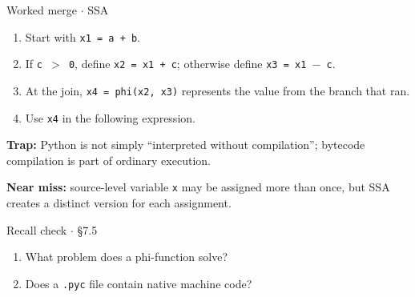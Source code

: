 \documentclass[11pt]{article}
\begin{document}
\begin{keepsection}
\begin{workedbox}{Worked merge \ensuremath{\cdot} SSA}
\begin{enumerate}
\item Start with \texttt{x1 = a + b}.
\item If \texttt{c \ensuremath{>} 0}, define \texttt{x2 = x1 + c}; otherwise define \texttt{x3 = x1 \ensuremath{-} c}.
\item At the join, \texttt{x4 = phi(x2, x3)} represents the value from the branch that ran.
\item Use \texttt{x4} in the following expression.
\end{enumerate}
\end{workedbox}

\begin{notebox}\textbf{Trap:} Python is not simply “interpreted without compilation”; bytecode compilation is part of ordinary execution.\end{notebox}

\begin{notebox}\textbf{Near miss:} source-level variable \texttt{x} may be assigned more than once, but SSA creates a distinct version for each assignment.\end{notebox}

\begin{recallbox}{Recall check \ensuremath{\cdot} §7.5}
\begin{enumerate}
\item What problem does a phi-function solve?
\item Does a \texttt{.pyc} file contain native machine code?
\end{enumerate}

\end{recallbox}
\end{keepsection}
\end{document}
